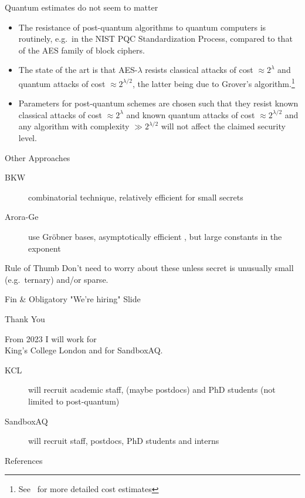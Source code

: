 \documentclass[table,10pt,aspectratio=169]{beamer}
\begin{document}
\begin{frame}[label={sec:org5e11d37}]{Quantum estimates do not seem to matter}
\begin{itemize}
\item The resistance of post-quantum algorithms to quantum computers is routinely, e.g. in the NIST PQC Standardization Process, compared to that of the AES family of block ciphers.
\item The state of the art is that AES-\(\lambda\) resists classical attacks of cost \(\approx 2^{\lambda}\) and quantum attacks of cost \(\approx 2^{\lambda/2}\), the latter being due to Grover's algorithm.\footnote{See \cite{EC:JNRV20} for more detailed cost estimates}
\item Parameters for post-quantum schemes are chosen such that they resist known classical attacks of cost \(\approx 2^{\lambda}\) and known quantum attacks of cost \(\approx 2^{\lambda/2}\) and any algorithm with complexity \(\gg 2^{\lambda/2}\) will not affect the claimed security level.
\end{itemize}
\end{frame}


\begin{frame}[label={sec:org5453dbc}]{Other Approaches}
\begin{description}
\item[{BKW}] combinatorial technique, relatively efficient for small secrets
\item[{Arora-Ge}] use Gröbner bases, asymptotically efficient , but large constants in the exponent
\end{description}

\begin{alertblock}{Rule of Thumb}
Don’t need to worry about these unless secret is unusually small (e.g. ternary) and/or sparse.
\end{alertblock}
\end{frame}

\begin{frame}[label={sec:org2288f43},standout]{Fin \& Obligatory "We're hiring" Slide}
\begin{center}
\Huge \alert{Thank You}
\end{center}

From 2023 I will work for\\
King's College London and for SandboxAQ.

\begin{description}
\item[{KCL}] will recruit academic staff, (maybe postdocs) and PhD students (not limited to post-quantum)
\item[{SandboxAQ}] will recruit staff, postdocs, PhD students and interns
\end{description}
\end{frame}

\begin{frame}[allowframebreaks]{References}
\renewcommand*{\bibfont}{\scriptsize}
\printbibliography[heading=none]
\end{frame}
\end{document}
